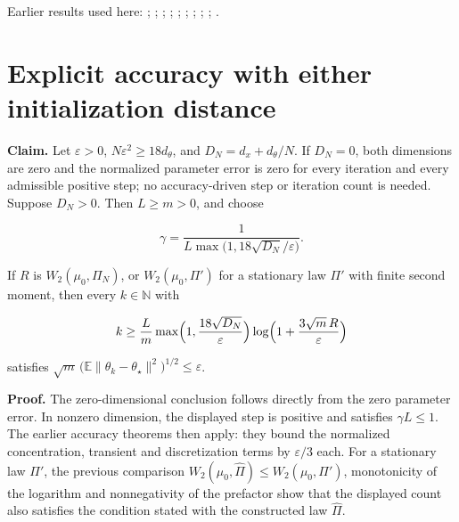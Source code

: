 \documentclass[11pt,a4paper]{article}
\begin{document}
Earlier results used here: \cite[Section~3.17.4]{LangevinLean2026ULASC}; \cite[Section~3.36.7]{LangevinLean2026ULASC}; \cite[Section~3.51.3]{LangevinLean2026ULASC}; \cite[Section~3.1.1]{LangevinLean2026IPLA}; \cite[Section~3.1.6]{LangevinLean2026IPLA}; \cite[Section~3.18.1]{LangevinLean2026IPLA}; \cite[Section~3.3.1]{LangevinLean2026IPLA}; \cite[Section~3.3.2]{LangevinLean2026IPLA}; \cite[Section~3.3.3]{LangevinLean2026IPLA}; \cite[Section~3.5.1]{LangevinLean2026IPLA}.

\section{\texorpdfstring{Explicit accuracy with either initialization distance}{Explicit accuracy with either initialization distance}}


\textbf{Claim.} Let \(\varepsilon>0\), \(N\varepsilon^2\ge18d_\theta\), and \(D_N=d_x+d_\theta/N\). If \(D_N=0\), both dimensions are zero and the normalized parameter error is zero for every iteration and every admissible positive step; no accuracy-driven step or iteration count is needed. Suppose \(D_N>0\). Then \(L\ge m>0\), and choose

\[\gamma=\frac1{L\max\bigl(1,18\sqrt{D_N}/\varepsilon\bigr)}.\]

If \(R\) is \(W_2(\mu_0,\Pi_N)\), or \(W_2(\mu_0,\Pi')\) for a stationary law \(\Pi'\) with finite second moment, then every \(k\in\mathbb N\) with

\[k\ge\frac Lm\max\Bigl(1,\frac{18\sqrt{D_N}}\varepsilon\Bigr)\log\Bigl(1+\frac{3\sqrt m\,R}\varepsilon\Bigr)\]

satisfies \(\sqrt m\,\bigl(\mathbb E\|\theta_k-\theta_\star\|^2\bigr)^{1/2}\le\varepsilon\).



\textbf{Proof.} The zero-dimensional conclusion follows directly from the zero parameter error. In nonzero dimension, the displayed step is positive and satisfies \(\gamma L\le1\). The earlier accuracy theorems then apply: they bound the normalized concentration, transient and discretization terms by \(\varepsilon/3\) each. For a stationary law \(\Pi'\), the previous comparison \(W_2(\mu_0,\widehat\Pi)\le W_2(\mu_0,\Pi')\), monotonicity of the logarithm and nonnegativity of the prefactor show that the displayed count also satisfies the condition stated with the constructed law \(\widehat\Pi\).
\end{document}
